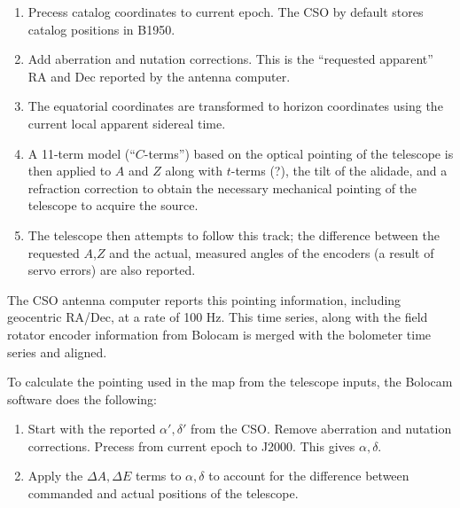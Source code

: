 \documentclass[12pt,preprint]{aastex}
\begin{document}
\begin{enumerate}

\item Precess catalog coordinates to current epoch.  The CSO by
default stores catalog positions in B1950.

\item Add aberration and nutation corrections.  This is the
``requested apparent'' RA and Dec reported by the antenna computer.

\item The equatorial coordinates are transformed to horizon
coordinates using the current local apparent sidereal time.

\item A 11-term model (``$C$-terms'') based on the optical pointing of
the telescope is then applied to $A$ and $Z$ along with $t$-terms (?),
the tilt of the alidade, and a refraction correction to obtain the
necessary mechanical pointing of the telescope to acquire the source.

\item The telescope then attempts to follow this track; the difference
between the requested $A$,$Z$ and the actual, measured angles of the
encoders (a result of servo errors) are also reported.



\end{enumerate}

The CSO antenna computer reports this pointing information, including
geocentric RA/Dec, at a rate of 100 Hz.  This time series, along with
the field rotator encoder information from Bolocam is merged with the
bolometer time series and aligned.

To calculate the pointing used in the map from the telescope inputs,
the Bolocam software does the following:

\begin{enumerate}

\item Start with the reported $\alpha',\delta'$ from the CSO.  Remove
aberration and nutation corrections.  Precess from current epoch to
J2000.  This gives $\alpha,\delta$.

\item Apply the $\Delta A,\Delta E$ terms to $\alpha,\delta$ to
account for the difference between commanded and actual positions of
the telescope.

\end{enumerate}
\end{document}
